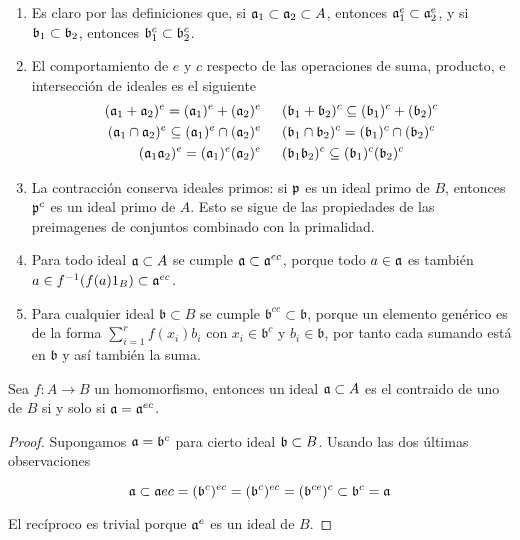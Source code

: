 \documentclass[./main.tex]{subfiles}
\begin{document}
	\begin{remark} \label{prop_ext_con}

		\begin{enumerate}
			\item Es claro por las definiciones que, si $\mathfrak{a}_1 \subset \mathfrak{a}_2 \subset A$, entonces $\mathfrak{a}_1^e \subset \mathfrak{a}_2^e$, y si $\mathfrak{b}_1 \subset \mathfrak{b}_2$, entonces $\mathfrak{b}_1^c \subset \mathfrak{b}_2^c$.
			\item El comportamiento de $e$ y $c$ respecto de las operaciones de suma, producto, e intersección de ideales es el siguiente\begin{align*}
			(\mathfrak{a}_1+\mathfrak{a}_2)^e=(\mathfrak{a}_1)^e+(\mathfrak{a}_2)^e\hspace{15pt}& (\mathfrak{b}_1+\mathfrak{b}_2)^c\subseteq(\mathfrak{b}_1)^c+(\mathfrak{b}_2)^c\\
			(\mathfrak{a}_1\cap\mathfrak{a}_2)^e\subseteq(\mathfrak{a}_1)^e\cap(\mathfrak{a}_2)^e\hspace{15pt}&(\mathfrak{b}_1\cap\mathfrak{b}_2)^c=(\mathfrak{b}_1)^c\cap(\mathfrak{b}_2)^c\\
			(\mathfrak{a}_1\mathfrak{a}_2)^e=(\mathfrak{a}_1)^e(\mathfrak{a}_2)^e\hspace{15pt}& (\mathfrak{b}_1\mathfrak{b}_2)^c\subseteq(\mathfrak{b}_1)^c(\mathfrak{b}_2)^c
			\end{align*}
			\item La contracción conserva ideales primos: si $\mathfrak{p}$ es un ideal primo de $B$, entonces $\mathfrak{p}^c$ es un ideal primo de $A$. Esto se sigue de las propiedades de las preimagenes de conjuntos combinado con la primalidad.
			\item Para todo ideal $\mathfrak{a} \subset A$ se cumple $\mathfrak{a} \subset \mathfrak{a}^{ec}$, porque todo $a\in \mathfrak{a}$ es también $a \in f^{-1}(f(a)1_B) \subset \mathfrak{a}^{ec}$.
			\item Para cualquier ideal $\mathfrak{b} \subset B$ se cumple $\mathfrak{b}^{ce}\subset \mathfrak{b}$, porque un elemento genérico es de la forma $\sum_{i=1}^r f(x_i) b_i $ con $x_i \in \mathfrak{b}^c$ y $b_i \in \mathfrak{b}$, por tanto cada sumando está en $\mathfrak b$ y así también la suma.
		\end{enumerate}
	\end{remark}


\begin{lemma}\label{ext-cont}
	Sea $f:A\to B$ un homomorfismo, entonces un ideal $\mathfrak{a} \subset A$ es el contraido de uno de $B$ si y solo si $\mathfrak{a} = \mathfrak{a}^{ec}$.
\end{lemma}
\begin{proof}
Supongamos $\mathfrak{a} =\mathfrak{b}^c$ para cierto ideal $\mathfrak{b} \subset B$. Usando las dos últimas observaciones

$$
\mathfrak{a} \subset \mathfrak{a}{ec} = (\mathfrak{b}^c)^{ec} = (\mathfrak{b}^c)^{ec} = (\mathfrak{b}^{ce})^c \subset \mathfrak{b}^c = \mathfrak{a}
$$

El recíproco es trivial porque $\mathfrak{a}^e$ es un ideal de $B$.
\end{proof}
\end{document}
